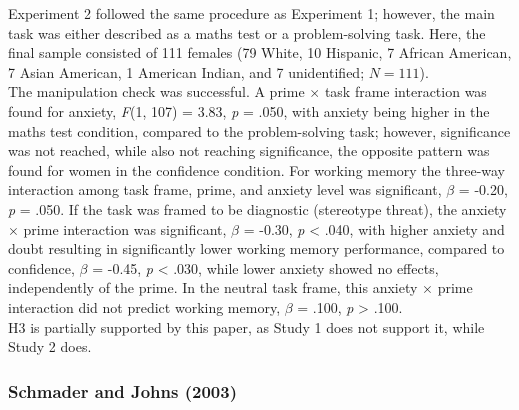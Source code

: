 \documentclass[
  stu,floatsintext]{apa7}
\begin{document}
Experiment 2 followed the same procedure as Experiment 1; however, the main task was either described as a maths test or a problem-solving task.
Here, the final sample consisted of 111 females (79 White, 10 Hispanic, 7 African American, 7 Asian American, 1 American Indian, and 7 unidentified; \(N = 111\)).\\
The manipulation check was successful.
A prime \(\times\) task frame interaction was found for anxiety, \emph{F}(1, 107) = 3.83, \emph{p} = .050, with anxiety being higher in the maths test condition, compared to the problem-solving task; however, significance was not reached, while also not reaching significance, the opposite pattern was found for women in the confidence condition.
For working memory the three-way interaction among task frame, prime, and anxiety level was significant, \(\beta\) = -0.20, \emph{p} = .050.
If the task was framed to be diagnostic (stereotype threat), the anxiety \(\times\) prime interaction was significant, \(\beta\) = -0.30, \emph{p} \textless{} .040, with higher anxiety and doubt resulting in significantly lower working memory performance, compared to confidence, \(\beta\) = -0.45, \emph{p} \textless{} .030, while lower anxiety showed no effects, independently of the prime.
In the neutral task frame, this anxiety \(\times\) prime interaction did not predict working memory, \(\beta\) = .100, \emph{p} \textgreater{} .100.\\
H3 is partially supported by this paper, as Study 1 does not support it, while Study 2 does.

\subsubsection{Schmader and Johns (2003)}\label{schmaderconvergingevidencethat2003}
\end{document}
